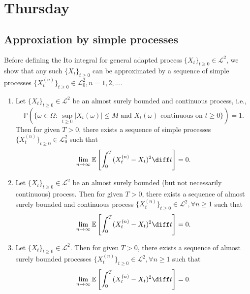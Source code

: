 \section{Thursday}
\subsection{Approxiation by simple processes}\label{sec:9:2:1}
\begin{remark}
Before defining the Ito integral for general adapted process $\{X_t\}_{t\ge0}\in\mathcal{L}^2$,
we show that any such $\{X_t\}_{t\ge0}$ can be approximated by a sequence of simple processes $\{X_t^{(n)}\}_{t\ge0}\in\mathcal{L}_0^2, n=1,2,\ldots$.
\end{remark}
\begin{theorem}\label{The:9:1}
\begin{enumerate}
\item
Let $\{X_t\}_{t\ge0}\in\mathcal{L}^2$ be an almost surely bounded and continuous process, i.e.,
\[
\mathbb{P}\left(
\bigg\{
\omega\in\Omega:~
\sup_{t\ge0}|X_t(\omega)|\le M\text{ and $X_t(\omega)$ continuous on $t\ge0$}
\bigg\}
\right)=1.
\]
Then for given $T>0$, there exists a sequence of simple processes $\{X_t^{(n)}\}_{t\ge0}\in\mathcal{L}_0^2$ such that
\[
\lim_{n\to\infty}\mathbb{E}\left[
\int_0^T(X_t^{(n)} - X_t)^2\diff t
\right]=0.
\]
\item
Let $\{X_t\}_{t\ge0}\in\mathcal{L}^2$ be an almost surely bounded (but not necessarily continuous) process.
Then for given $T>0$, there exists a sequence of almost surely bounded and continuous process
$\{X_t^{(n)}\}_{t\ge0}\in\mathcal{L}^2, \forall n\ge1$ such that
\[
\lim_{n\to\infty}\mathbb{E}\left[
\int_0^T(X_t^{(n)} - X_t)^2\diff t
\right]=0.
\]
\item
Let $\{X_t\}_{t\ge0}\in\mathcal{L}^2$. Then for given $T>0$, there exists a sequence of almost surely bounded processes $\{X_t^{(n)}\}_{t\ge0}\in\mathcal{L}^2, \forall n\ge1$ such that
\[
\lim_{n\to\infty}\mathbb{E}\left[
\int_0^T(X_t^{(n)} - X_t)^2\diff t
\right]=0.
\]
\end{enumerate}
\end{theorem}
